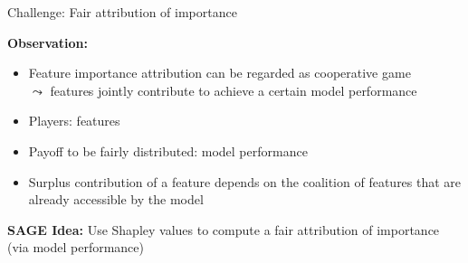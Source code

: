 \documentclass[11pt,compress,t,notes=noshow, aspectratio=169, xcolor=table]{beamer}
\begin{document}
\begin{frame}{Challenge: Fair attribution of importance 
}

\textbf{Observation:} 
\begin{itemize}
    \item Feature importance attribution can be regarded as cooperative game \\
    $\leadsto$ features jointly contribute to achieve a certain model performance
    \item Players: features
    \item Payoff to be fairly distributed: model performance
    \item Surplus contribution of a feature depends on the coalition of features that are already accessible by the model
\end{itemize}
\lz
\textbf{SAGE Idea:} %
Use Shapley values to compute a fair attribution of importance (via model performance)\\
  
\end{frame}
\end{document}
